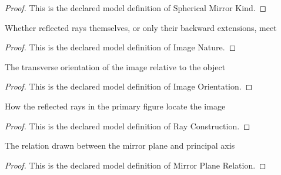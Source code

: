\begin{proof}
  This is the declared model definition of Spherical Mirror Kind.
\end{proof}
\begin{definition}
  \label{def:physics:phyx-mini-0059:phyxminiproblems-problemphyxmini0059-imagenature}
  Whether reflected rays themselves, or only their backward extensions, meet
\end{definition}
\begin{proof}
  This is the declared model definition of Image Nature.
\end{proof}
\begin{definition}
  \label{def:physics:phyx-mini-0059:phyxminiproblems-problemphyxmini0059-imageorientation}
  The transverse orientation of the image relative to the object
\end{definition}
\begin{proof}
  This is the declared model definition of Image Orientation.
\end{proof}
\begin{definition}
  \label{def:physics:phyx-mini-0059:phyxminiproblems-problemphyxmini0059-rayconstruction}
  How the reflected rays in the primary figure locate the image
\end{definition}
\begin{proof}
  This is the declared model definition of Ray Construction.
\end{proof}
\begin{definition}
  \label{def:physics:phyx-mini-0059:phyxminiproblems-problemphyxmini0059-mirrorplanerelation}
  The relation drawn between the mirror plane and principal axis
\end{definition}
\begin{proof}
  This is the declared model definition of Mirror Plane Relation.
\end{proof}
